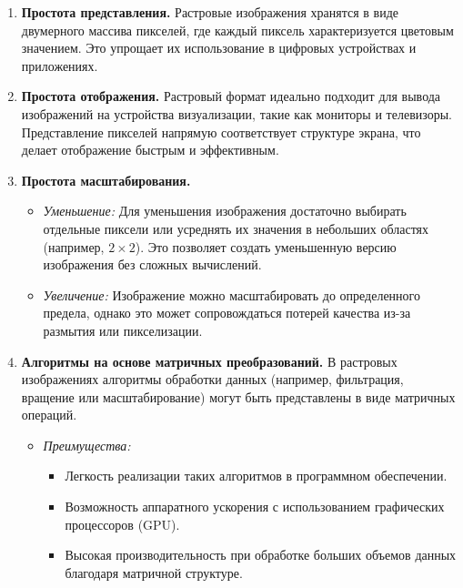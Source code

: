 \begin{enumerate}[label=\textbf{\arabic*.}, leftmargin=1.5em]

    \item \textbf{Простота представления.}
          Растровые изображения хранятся в виде двумерного массива пикселей, где каждый пиксель характеризуется цветовым значением. Это упрощает их использование в цифровых устройствах и приложениях.

    \item \textbf{Простота отображения.}
          Растровый формат идеально подходит для вывода изображений на устройства визуализации, такие как мониторы и телевизоры. Представление пикселей напрямую соответствует структуре экрана, что делает отображение быстрым и эффективным.

    \item \textbf{Простота масштабирования.}
          \begin{itemize}
              \item \textit{Уменьшение:} Для уменьшения изображения достаточно выбирать отдельные пиксели или усреднять их значения в небольших областях (например, \(2 \times 2\)). Это позволяет создать уменьшенную версию изображения без сложных вычислений.
              \item \textit{Увеличение:} Изображение можно масштабировать до определенного предела, однако это может сопровождаться потерей качества из-за размытия или пикселизации.
          \end{itemize}

    \item \textbf{Алгоритмы на основе матричных преобразований.}
          В растровых изображениях алгоритмы обработки данных (например, фильтрация, вращение или масштабирование) могут быть представлены в виде матричных операций.
          \begin{itemize}
              \item \textit{Преимущества:}
                    \begin{itemize}
                        \item Легкость реализации таких алгоритмов в программном обеспечении.
                        \item Возможность аппаратного ускорения с использованием графических процессоров (GPU).
                        \item Высокая производительность при обработке больших объемов данных благодаря матричной структуре.
                    \end{itemize}
          \end{itemize}

\end{enumerate}

